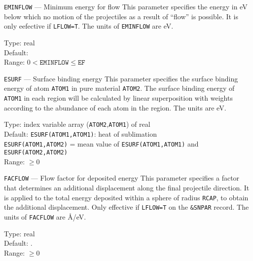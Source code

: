 \ifprivate
\begin{keydescription}{\texttt{EMINFLOW} --- Minimum energy for flow}
%
  This parameter specifies the energy in eV below which no motion of the 
  projectiles as a result of ``flow'' is possible. It is only eefective if
  \texttt{LFLOW=T}. The units of \texttt{EMINFLOW} are eV. 
  \begin{keytab}
    Type:    \> real \\
    Default:  \\
    Range:   \> $0 < \texttt{EMINFLOW} \le \texttt{EF}$
  \end{keytab}
\end{keydescription}
\fi

\begin{keydescription}{\texttt{ESURF} --- Surface binding energy}
%
  This parameter specifies the surface binding energy of atom
  \texttt{ATOM1} in pure material \texttt{ATOM2}.  The surface binding energy
  of \texttt{ATOM1} in each region will be calculated by linear superposition
  with weights according to the abundance of each atom in the region. The
  units are eV.
  \begin{keytab}
    Type:    \> index variable array (\texttt{ATOM2},\texttt{ATOM1}) of real \\
    Default: \> \texttt{ESURF(ATOM1,ATOM1)}: heat of sublimation \\
             \> \texttt{ESURF(ATOM1,ATOM2)} = mean value of
                \texttt{ESURF(ATOM1,ATOM1)} and \\
             \> \texttt{ESURF(ATOM2,ATOM2)} \\
    Range:   \> $\ge 0$
  \end{keytab}
\end{keydescription}

\ifprivate
\begin{keydescription}{\texttt{FACFLOW} --- Flow factor for deposited energy}
%
  This parameter specifies a factor that determines an additional displacement
  along the final projectile direction. It is applied to the total energy
  deposited within a sphere of radius \texttt{RCAP}, to obtain the additional
  displacement. Only effective if \texttt{LFLOW=T} on the \texttt{\&SNPAR}
  record. The units of \texttt{FACFLOW} are \AA/eV.
  \begin{keytab}
    Type:    \> real \\
    Default: . \\
    Range:   \> $\ge 0$
  \end{keytab}
\end{keydescription}
\fi 

